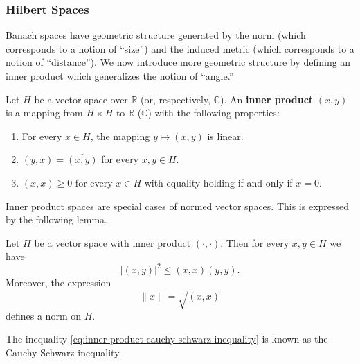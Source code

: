 \subsubsection{Hilbert Spaces}\label{subsec:hilbert-spaces}

Banach spaces have geometric structure generated by the norm (which corresponds to a notion of ``size'') and the induced metric (which corresponds to a notion of ``distance''). We now introduce more geometric structure by defining an inner product which generalizes the notion of ``angle.''

\begin{Definition}
\label{def:inner-product}
Let $H$ be a vector space over $\mathbb{R}$ (or, respectively, $\mathbb{C}$). An \textbf{inner product} $(x,y)$ is a mapping from $H\times H$ to $\mathbb{R}$ ($\mathbb{C}$) with the following properties:\begin{enumerate}
\item For every $x\in H$, the mapping $y\mapsto(x,y)$ is linear.
\item $(y,x)=\overline{(x,y)}$ for every $x,y\in H$.
\item $(x,x)\geq0$ for every $x\in H$ with equality holding if and only if $x=0$.
\end{enumerate}
\end{Definition}

Inner product spaces are special cases of normed vector spaces. This is expressed by the following lemma.

\begin{Lemma}
\label{lem:inner-product-induced-norm}
Let $H$ be a vector space with inner product $(\cdot,\cdot)$. Then for every $x,y\in H$ we have
\begin{equation}\label{eq:inner-product-cauchy-schwarz-inequality}
|(x,y)|^2\leq(x,x)(y,y).
\end{equation}
Moreover, the expression
\begin{equation}\label{eq:inner-product-induced-norm}
\|x\|=\sqrt{(x,x)}
\end{equation}
defines a norm on $H$.
\end{Lemma}

The inequality \eqref{eq:inner-product-cauchy-schwarz-inequality} is known as the Cauchy-Schwarz inequality.

